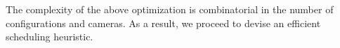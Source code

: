 %

The complexity of the above optimization is combinatorial in the number of configurations and cameras. As a result, we proceed to devise an efficient scheduling heuristic.%
